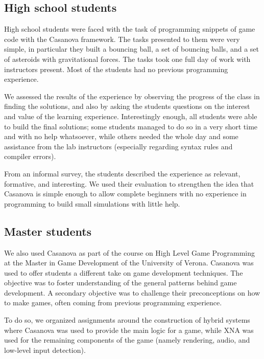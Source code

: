 \subsection{High school students}
High school students were faced with the task of programming snippets of game code with the Casanova framework. The tasks presented to them were very simple, in particular they built a bouncing ball, a set of bouncing balls, and a set of asteroids with gravitational forces. The tasks took one full day of work with instructors present. Most of the students had no previous programming experience.

We assessed the results of the experience by observing the progress of the class in finding the solutions, and also by asking the students questions on the interest and value of the learning experience. Interestingly enough, all students were able to build the final solutions; some students managed to do so in a very short time and with no help whatsoever, while others needed the whole day and some assistance from the lab instructors (especially regarding syntax rules and compiler errors).

From an informal survey, the students described the experience as relevant, formative, and interesting. We used their evaluation to strengthen the idea that Casanova is simple enough to allow complete beginners with no experience in programming to build small simulations with little help.

\subsection{Master students}
We also used Casanova as part of the course on High Level Game Programming at the Master in Game Development of the University of Verona. Casanova was used to offer students a different take on game development techniques. The objective was to foster understanding of the general patterns behind game development. A secondary objective was to challenge their preconceptions on how to make games, often coming from previous programming experience.

To do so, we organized assignments around the construction of hybrid systems where Casanova was used to provide the main logic for a game, while XNA was used for the remaining components of the game (namely rendering, audio, and low-level input detection).

